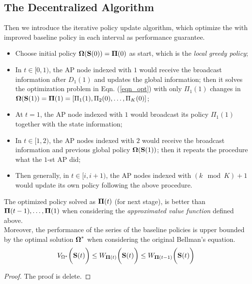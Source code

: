 \subsection{The Decentralized Algorithm}
Then we introduce the iterative policy update algorithm, which optimize the 
with improved baseline policy in each interval as performance guarantee.
\begin{itemize}
    \item Choose initial policy $\boldsymbol{\Omega}(\mathbf{S}(0)) = \boldsymbol{\Pi}(0)$ as start, which is the \emph{local greedy policy};
    \item In $t\in[0, 1)$, the AP node indexed with $1$ would receive the broadcast information after $D_1(1)$ and updates the global information; then it solves the optimization problem in Eqn. (\ref{eqn_opt}) with only $\Pi_{1}(1)$ changes in $\boldsymbol{\Omega}(\mathbf{S}(1)) = \boldsymbol{\Pi}(1) = [\Pi_{1}(1), \Pi_{2}(0), \dots, \Pi_{K}(0)]$;
    \item At $t=1$, the AP node indexed with $1$ would broadcast its policy $\Pi_{1}(1)$ together with the state information;
    \item In $t\in[1, 2)$, the AP nodes indexed with $2$ would receive the broadcast information and previous global policy $\boldsymbol{\Omega}(\mathbf{S}(1))$; then it repeats the procedure what the $1$-st AP did;
    \item Then generally, in $t\in[{i}, {i+1})$, the AP nodes indexed with $(k \mod K)+1$ would update its own policy following the above procedure.
\end{itemize}

\begin{lemma}
    The optimized policy solved as $\boldsymbol{\Pi}(t)$ (for next stage), is better than $\boldsymbol{\Pi}(t-1), \dots, \boldsymbol{\Pi}(1)$ when considering the \emph{approximated value function} defined above.
    \\
    Moreover, the performance of the series of the baseline policies is upper bounded by the optimal solution $\boldsymbol{\Omega}^*$ when considering the original Bellman's equation.
    $$
        V_{\Omega^*}\bigg(\mathbf{S}(t)\bigg)
        \leq W_{\boldsymbol{\Pi}(t)}\bigg(\mathbf{S}(t)\bigg)
        \leq W_{\boldsymbol{\Pi}(t-1)}\bigg(\mathbf{S}(t)\bigg)
    $$
\end{lemma}
\begin{proof}
    The proof is delete.
\end{proof}

